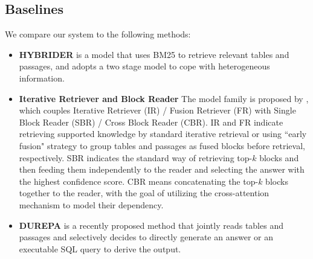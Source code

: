 \documentclass[11pt]{article}
\begin{document}
	\subsection{Baselines}
	We compare our system to the following methods:
	\begin{itemize}
		\item \textbf{HYBRIDER} \cite{chen2020hybridqa} is a model that uses BM25 to retrieve relevant tables and passages, and adopts a two stage model to cope with heterogeneous information.
		\item \textbf{Iterative Retriever and Block Reader} The model family is proposed by \citet{chen2020open}, which couples Iterative Retriever (IR) / Fusion Retriever (FR) with Single Block Reader (SBR) / Cross Block Reader (CBR). IR and FR indicate retrieving supported knowledge by standard iterative retrieval or using ``early fusion" strategy to group tables and passages as fused blocks before retrieval, respectively. SBR indicates the standard way of retrieving top-$k$ blocks and then feeding them independently to the reader and selecting the answer with the highest confidence score. CBR means concatenating the top-$k$ blocks together to the reader, with the goal of utilizing the cross-attention mechanism to model their dependency. 
		\item \textbf{DUREPA} \cite{li2021dual} is a recently proposed method that jointly reads tables and passages and selectively decides to directly generate an answer or an executable SQL query to derive the output. 
	\end{itemize}
	
\end{document}
